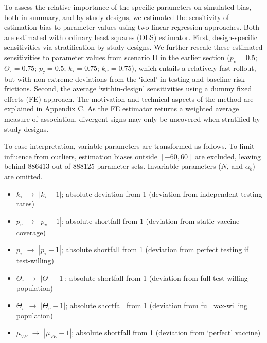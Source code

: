 \documentclass[12pt]{article}
\begin{document}
To assess the relative importance of the specific parameters on simulated bias, both in summary, and by study designs, we estimated the sensitivity of estimation bias to parameter values using two linear regression approaches. Both are estimated with ordinary least squares (OLS) estimator. First, design-specific sensitivities via stratification by study designs. We further rescale these estimated sensitivities to parameter values from scenario D in the earlier section ($p_v=0.5$; $\Theta_{\tau}=0.75$; $p_\tau=0.5$; $k_\tau=0.75$; $k_\alpha=0.75$), which entails a relatively fast rollout, but with non-extreme deviations from the `ideal' in testing and baseline risk frictions. Second, the average `within-design' sensitivities using a dummy fixed effects (FE) approach. The motivation and technical aspects of the method are explained in Appendix C. As the FE estimator returns a weighted average measure of association, divergent signs may only be uncovered when stratified by study designs.

To ease interpretation, variable parameters are transformed as follows. To limit influence from outliers, estimation biases outside $[-60, 60]$ are excluded, leaving behind $886413$ out of $888125$ parameter sets. Invariable parameters ($N$, and $\alpha_{b}$) are omitted.
\begin{itemize}
	\item $k_\tau$ $\rightarrow$ $|k_\tau - 1|$; absolute deviation from 1 (deviation from independent testing rates)
	\item $p_v$ $\rightarrow$ $|p_v - 1|$; absolute shortfall from 1 (deviation from static vaccine coverage)
	\item $p_\tau$ $\rightarrow$ $|p_\tau - 1|$; absolute shortfall from 1 (deviation from perfect testing if test-willing)
	\item $\Theta_\tau$ $\rightarrow$ $|\Theta_\tau - 1|$; absolute shortfall from 1 (deviation from full test-willing population)
	\item $\Theta_{v}$ $\rightarrow$ $|\Theta_{v} - 1|$; absolute shortfall from 1 (deviation from full vax-willing population)
	\item $\mu_{VE}$ $\rightarrow$ $|\mu_{VE} - 1|$; absolute shortfall from 1 (deviation from `perfect' vaccine)
\end{itemize}
\end{document}
